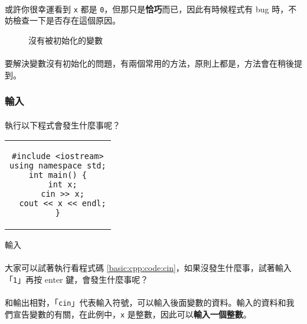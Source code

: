 \documentclass[12pt,a4paper,oneside]{article}
\begin{document}
\begin{CJK}{UTF8}{bkai}
\paragraph{}或許你很幸運看到 \lstinline!x! 都是 \lstinline!0!，但那只是\textbf{恰巧}而已，因此有時候程式有 bug 時，不妨檢查一下是否存在這個原因。

\begin{figure}[h!]
\centering
{}
\caption{沒有被初始化的變數}
\label{basic:cpp:fig:non:init:variable}
\end{figure}

\paragraph{}要解決變數沒有初始化的問題，有兩個常用的方法，原則上都是，方法會在稍後提到。

\subsubsection{輸入}

\paragraph{}執行以下程式會發生什麼事呢？

\begin{code}[h!]
\centering
\begin{tabular}{c}
\begin{lstlisting}
#include <iostream>
using namespace std;
int main() {
  int x;
  cin >> x;
  cout << x << endl;
}
\end{lstlisting}
\end{tabular}
\caption{輸入}
\label{basic:cpp:code:cin}
\end{code}

\paragraph{}大家可以試著執行看程式碼 \ref{basic:cpp:code:cin}，如果沒發生什麼事，試著輸入「\lstinline!1!」再按 enter 鍵，會發生什麼事呢？
\paragraph{}和輸出相對，「\lstinline!cin!」代表輸入符號，可以輸入後面變數的資料。輸入的資料和我們宣告變數的有關，在此例中，\lstinline!x! 是整數，因此可以\textbf{輸入一個整數}。

\end{CJK}
\end{document}
